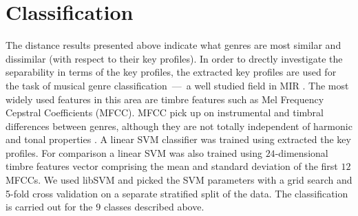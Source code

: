 \documentclass{article}
\begin{document}
\section{Classification}\label{sec:classification}
The distance results presented above indicate what genres are most similar and dissimilar (with respect to their key profiles). In order to drectly investigate the separability in terms of the key profiles, the extracted key profiles are used for the task of musical genre classification~---~a well studied field in MIR \cite{fu_survey_2011}. The most widely used features in this area are timbre features such as Mel Frequency Cepstral Coefficients (MFCC). MFCC pick up on instrumental and timbral differences between genres, although they are not totally independent of harmonic and tonal properties \cite{li_genre_2011}.
A linear SVM classifier was trained using extracted the key profiles. For comparison a linear SVM was also trained using $24$-dimensional timbre features vector comprising the mean and standard deviation of the first $12$ MFCCs. %
We used libSVM  \cite{chang_libsvm:_2011} and picked the SVM parameters with a grid search and 5-fold cross validation on a separate stratified split of the data. The classification is carried out for the $9$ classes described above.
\end{document}
